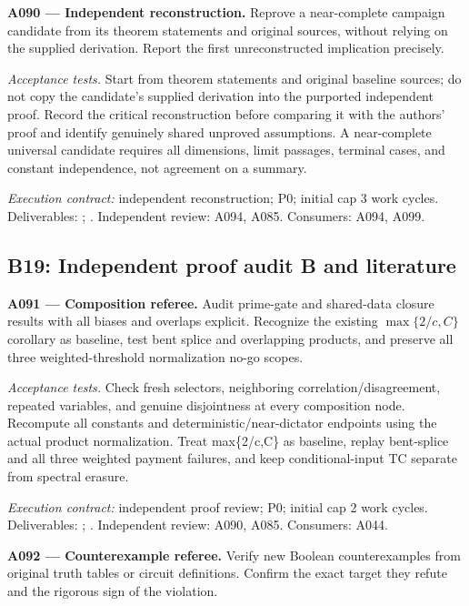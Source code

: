 \documentclass[11pt]{article}
\begin{document}
\textbf{A090 --- Independent reconstruction.} Reprove a near-complete campaign candidate from its theorem statements and original sources, without relying on the supplied derivation. Report the first unreconstructed implication precisely.

\emph{Acceptance tests.} Start from theorem statements and original baseline sources; do not copy the candidate's supplied derivation into the purported independent proof. Record the critical reconstruction before comparing it with the authors' proof and identify genuinely shared unproved assumptions. A near-complete universal candidate requires all dimensions, limit passages, terminal cases, and constant independence, not agreement on a summary.

{\small\emph{Execution contract:} independent reconstruction; P0; initial cap 3 work cycles. Deliverables: ; . Independent review: A094, A085. Consumers: A094, A099.}

\subsection{B19: Independent proof audit B and literature}

\textbf{A091 --- Composition referee.} Audit prime-gate and shared-data closure results with all biases and overlaps explicit. Recognize the existing $\max\{2/c,C\}$ corollary as baseline, test bent splice and overlapping products, and preserve all three weighted-threshold normalization no-go scopes.

\emph{Acceptance tests.} Check fresh selectors, neighboring correlation/disagreement, repeated variables, and genuine disjointness at every composition node. Recompute all constants and deterministic/near-dictator endpoints using the actual product normalization. Treat max\{2/c,C\} as baseline, replay bent-splice and all three weighted payment failures, and keep conditional-input TC separate from spectral erasure.

{\small\emph{Execution contract:} independent proof review; P0; initial cap 2 work cycles. Deliverables: ; . Independent review: A090, A085. Consumers: A044.}

\textbf{A092 --- Counterexample referee.} Verify new Boolean counterexamples from original truth tables or circuit definitions. Confirm the exact target they refute and the rigorous sign of the violation.
\end{document}
